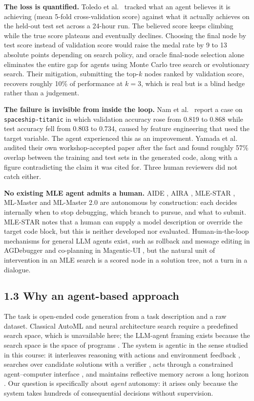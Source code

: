 \documentclass[11pt]{article}
\begin{document}
\textbf{The loss is quantified.} Toledo et al.\ \cite{aira} tracked what an agent
believes it is achieving (mean 5-fold cross-validation score) against what it
actually achieves on the held-out test set across a 24-hour run. The believed score
keeps climbing while the true score plateaus and eventually declines. Choosing the
final node by test score instead of validation score would raise the medal rate by 9
to 13 absolute points depending on search policy, and oracle final-node selection
alone eliminates the entire gap for agents using Monte Carlo tree search or
evolutionary search. Their mitigation, submitting the top-$k$ nodes ranked by
validation score, recovers roughly 10\% of performance at $k=3$, which is real but is
a blind hedge rather than a judgement.

\textbf{The failure is invisible from inside the loop.} Nam et al.\ \cite{mlestar}
report a case on \texttt{spaceship-titanic} in which validation accuracy rose from
0.819 to 0.868 while test accuracy fell from 0.803 to 0.734, caused by feature
engineering that used the target variable. The agent experienced this as an
improvement. Yamada et al.\ \cite{aisci2} audited their own workshop-accepted paper
after the fact and found roughly 57\% overlap between the training and test sets in
the generated code, along with a figure contradicting the claim it was cited for.
Three human reviewers did not catch either.

\textbf{No existing MLE agent admits a human.} AIDE \cite{aide}, AIRA \cite{aira},
MLE-STAR \cite{mlestar}, ML-Master \cite{mlmaster} and ML-Master 2.0
\cite{mlmaster2} are autonomous by construction: each decides internally when to stop
debugging, which branch to pursue, and what to submit. MLE-STAR notes that a human
can supply a model description or override the target code block, but this is
neither developed nor evaluated. Human-in-the-loop mechanisms for general LLM agents
exist, such as rollback and message editing in AGDebugger \cite{agdebugger} and
co-planning in Magentic-UI \cite{magentic}, but the natural unit of intervention in
an MLE search is a scored node in a solution tree, not a turn in a dialogue.

\subsection*{1.3 Why an agent-based approach}

The task is open-ended code generation from a task description and a raw dataset.
Classical AutoML and neural architecture search require a predefined search space,
which is unavailable here; the LLM-agent framing exists because the search space is
the space of programs \cite{aide}. The system is agentic in the sense studied in this
course: it interleaves reasoning with actions and environment feedback
\cite{react}, searches over candidate solutions with a verifier
\cite{tot}, acts through a constrained agent--computer interface \cite{sweagent},
and maintains reflective memory across a long horizon \cite{genagents}. Our question
is specifically about \emph{agent} autonomy: it arises only because the system takes
hundreds of consequential decisions without supervision.
\end{document}
